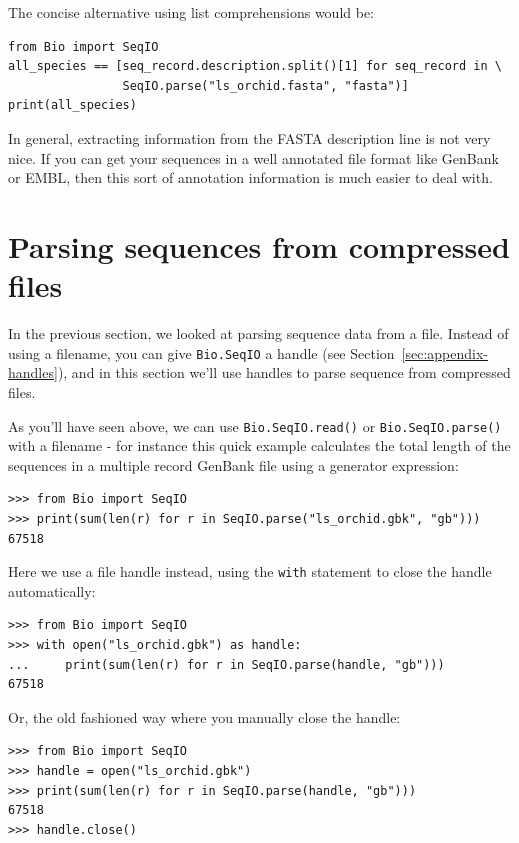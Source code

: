 \documentclass{report}
\begin{document}
The concise alternative using list comprehensions would be:

\begin{verbatim}
from Bio import SeqIO
all_species == [seq_record.description.split()[1] for seq_record in \
                SeqIO.parse("ls_orchid.fasta", "fasta")]
print(all_species)
\end{verbatim}

In general, extracting information from the FASTA description line is not very nice.
If you can get your sequences in a well annotated file format like GenBank or EMBL,
then this sort of annotation information is much easier to deal with.

\section{Parsing sequences from compressed files}
\label{sec:SeqIO_compressed}
In the previous section, we looked at parsing sequence data from a file.
Instead of using a filename, you can give \verb|Bio.SeqIO| a handle
(see Section~\ref{sec:appendix-handles}), and in this section
we'll use handles to parse sequence from compressed files.

As you'll have seen above, we can use \verb|Bio.SeqIO.read()| or
\verb|Bio.SeqIO.parse()| with a filename - for instance this quick
example calculates the total length of the sequences in a multiple
record GenBank file using a generator expression:

\begin{verbatim}
>>> from Bio import SeqIO
>>> print(sum(len(r) for r in SeqIO.parse("ls_orchid.gbk", "gb")))
67518
\end{verbatim}

\noindent
Here we use a file handle instead, using the \verb|with| statement
to close the handle automatically:

\begin{verbatim}
>>> from Bio import SeqIO
>>> with open("ls_orchid.gbk") as handle:
...     print(sum(len(r) for r in SeqIO.parse(handle, "gb")))
67518
\end{verbatim}

\noindent
Or, the old fashioned way where you manually close the handle:

\begin{verbatim}
>>> from Bio import SeqIO
>>> handle = open("ls_orchid.gbk")
>>> print(sum(len(r) for r in SeqIO.parse(handle, "gb")))
67518
>>> handle.close()
\end{verbatim}
\end{document}
